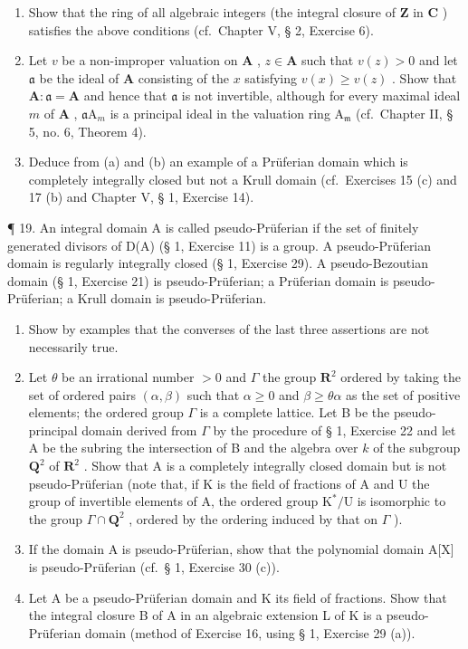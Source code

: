 \begin{enumerate}
\def\labelenumi{(\alph{enumi})}
\item
  Show that the ring of all algebraic integers (the integral closure of \(\mathbf{Z}\) in \(\mathbf{C}\) ) satisfies the above conditions (cf.~Chapter V, § 2, Exercise 6).
\item
  Let \(v\) be a non-improper valuation on \(\mathbf{A}\) , \(z \in \mathbf{A}\) such that \(v(z) > 0\) and let \(\mathfrak{a}\) be the ideal of \(\mathbf{A}\) consisting of the \(x\) satisfying \(v(x) \geqslant v(z)\) . Show that \(\mathbf{A}: \mathfrak{a} = \mathbf{A}\) and hence that \(\mathfrak{a}\) is not invertible, although for every maximal ideal \(m\) of \(\mathbf{A}\) , \(\mathfrak{a}\mathrm{A}_{m}\) is a principal ideal in the valuation ring \(\mathrm{A}_{\mathfrak{m}}\) (cf.~Chapter II, § 5, no. 6, Theorem 4).
\item
  Deduce from (a) and (b) an example of a Prüferian domain which is completely integrally closed but not a Krull domain (cf.~Exercises 15 (c) and 17 (b) and Chapter V, § 1, Exercise 14).
\end{enumerate}

¶ 19. An integral domain A is called pseudo-Prüferian if the set of finitely generated divisors of D(A) (§ 1, Exercise 11) is a group. A pseudo-Prüferian domain is regularly integrally closed (§ 1, Exercise 29). A pseudo-Bezoutian domain (§ 1, Exercise 21) is pseudo-Prüferian; a Prüferian domain is pseudo-Prüferian; a Krull domain is pseudo-Prüferian.

\begin{enumerate}
\def\labelenumi{(\alph{enumi})}
\item
  Show by examples that the converses of the last three assertions are not necessarily true.
\item
  Let \(\theta\) be an irrational number \(>0\) and \(\Gamma\) the group \(\mathbf{R}^2\) ordered by taking the set of ordered pairs \((\alpha, \beta)\) such that \(\alpha \geqslant 0\) and \(\beta \geqslant \theta \alpha\) as the set of positive elements; the ordered group \(\Gamma\) is a complete lattice. Let B be the pseudo-principal domain derived from \(\Gamma\) by the procedure of § 1, Exercise 22 and let A be the subring the intersection of B and the algebra over \(k\) of the subgroup \(\mathbf{Q}^2\) of \(\mathbf{R}^2\) . Show that A is a completely integrally closed domain but is not pseudo-Prüferian (note that, if K is the field of fractions of A and U the group of invertible elements of A, the ordered group \(\mathrm{K}^*/\mathrm{U}\) is isomorphic to the group \(\Gamma \cap \mathbf{Q}^2\) , ordered by the ordering induced by that on \(\Gamma\) ).
\item
  If the domain A is pseudo-Prüferian, show that the polynomial domain A{[}X{]} is pseudo-Prüferian (cf.~§ 1, Exercise 30 (c)).
\item
  Let A be a pseudo-Prüferian domain and K its field of fractions. Show that the integral closure B of A in an algebraic extension L of K is a pseudo-Prüferian domain (method of Exercise 16, using § 1, Exercise 29 (a)).
\end{enumerate}

